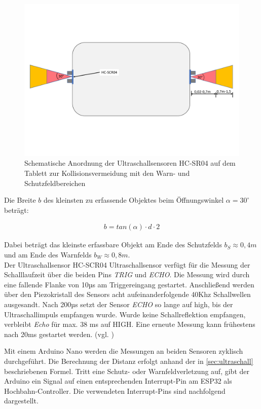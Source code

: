 \begin{figure}[h]
	\begin{center}
		\includegraphics[width=16cm]{kollisionsvermeidung.pdf}
		\caption{Schematische Anordnung der Ultraschallsensoren HC-SR04 auf dem Tablett zur Kollisionsvermeidung mit den Warn- und Schutzfeldbereichen}
		\label{pic:kollisionsvermeidung}
	\end{center}
\end{figure}
\newpage

Die Breite $b$ des kleinsten zu erfassende Objektes beim Öffnungswinkel $\alpha = 30^{\circ}$ beträgt:

\begin{align}
	b= tan(\alpha) \cdot d \cdot 2
\end{align}

 Dabei beträgt das kleinste erfassbare Objekt am Ende des Schutzfelds $b_S \approx 0,4m$ und am Ende des Warnfelds $b_W \approx 0,8m$. \\
 
Der Ultraschallsensor HC-SCR04 Ultraschallsensor verfügt für die Messung der Schalllaufzeit über die beiden Pins \textit{TRIG} und \textit{ECHO}. Die Messung wird durch eine fallende Flanke von 10µs am Triggereingang gestartet. Anschließend werden über den  Piezokristall des Sensors acht aufeinanderfolgende 40Khz Schallwellen ausgesandt. Nach 200µs setzt der Sensor \textit{ECHO} so lange auf high, bis der Ultraschallimpuls empfangen wurde. Wurde keine Schallreflektion empfangen, verbleibt  \textit{Echo} für max. 38 ms auf HIGH. Eine erneute Messung kann frühestens nach 20ms gestartet werden. (vgl. \cite{hcrs04})

Mit einem Arduino Nano werden die Messungen an beiden Sensoren zyklisch durchgeführt. Die Berechnung der Distanz erfolgt anhand der in \autoref{sec:ultraschall} beschriebenen Formel. Tritt eine Schutz- oder Warnfeldverletzung auf, gibt der Arduino ein Signal auf einen entsprechenden Interrupt-Pin am ESP32 als  Hochbahn-Controller. Die verwendeten Interrupt-Pins sind nachfolgend dargestellt. \\


